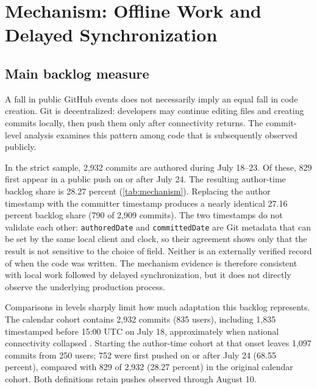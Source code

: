 \section{Mechanism: Offline Work and Delayed Synchronization}
\label{sec:mechanism}

\subsection{Main backlog measure}
\label{sec:backlog}

A fall in public GitHub events does not necessarily imply an equal fall in code creation. Git is decentralized: developers may continue editing files and creating commits locally, then push them only after connectivity returns. The commit-level analysis examines this pattern among code that is subsequently observed publicly.

In the strict sample, 2,932 commits are authored during July 18--23. Of these, 829 first appear in a public push on or after July 24. The resulting author-time backlog share is 28.27 percent (\cref{tab:mechanism}). Replacing the author timestamp with the committer timestamp produces a nearly identical 27.16 percent backlog share (790 of 2,909 commits). The two timestamps do not validate each other: \texttt{authoredDate} and \texttt{committedDate} are Git metadata that can be set by the same local client and clock, so their agreement shows only that the result is not sensitive to the choice of field. Neither is an externally verified record of when the code was written. The mechanism evidence is therefore consistent with local work followed by delayed synchronization, but it does not directly observe the underlying production process.

Comparisons in levels sharply limit how much adaptation this backlog represents. The calendar cohort contains 2,932 commits (835 users), including 1,835 timestamped before 15:00 UTC on July 18, approximately when national connectivity collapsed \citep{belson2024}. Starting the author-time cohort at that onset leaves 1,097 commits from 250 users; 752 were first pushed on or after July 24 (68.55 percent), compared with 829 of 2,932 (28.27 percent) in the original calendar cohort. Both definitions retain pushes observed through August 10.

